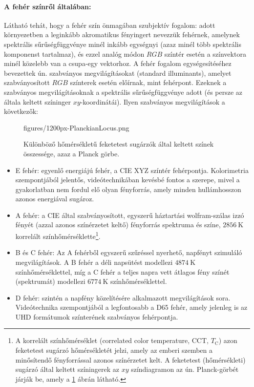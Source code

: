 \paragraph{A fehér színről általában:\\}
Látható tehát, hogy a fehér szín önmagában szubjektív fogalom: adott környezetben a leginkább akromatikus fényingert nevezzük fehérnek, amelynek spektrális sűrűségfüggvénye minél inkább egységnyi (azaz minél több spektrális komponenst tartalmaz), és ezzel analóg módon $RGB$ színtér esetén a színvektora minél közelebb van a csupa-egy vektorhoz.
A fehér fogalom egységesítéséhez bevezettek ún. szabványos megvilágításokat (standard illuminants), amelyet szabványosított $RGB$ színterek esetén előírnak, mint fehérpont.
Ezeknek a szabványos megvilágításoknak a spektrális sűrűségfüggvénye adott (és persze az általa keltett színinger $xy$-koordinátái).
Ilyen szabványos megvilágítások a következők:
\begin{figure}[]
	\centering
	\begin{minipage}[c]{0.6\textwidth}
	\begin{overpic}[width = 0.9\columnwidth ]{figures/1200px-PlanckianLocus.png}
	\end{overpic} \end{minipage}\hfill
	\begin{minipage}[c]{0.4\textwidth}
	\caption{Különböző hőmérsékletű feketetest sugárzók által keltett színek összessége, azaz a Planck görbe.}
	\label{Fig:planck}  \end{minipage}
\end{figure}
\begin{itemize}
\item E fehér: egyenlő energiájú fehér, a CIE XYZ színtér fehérpontja. Kolorimetria szempontjából jelentős, videótechnikában kevésbé fontos a szerepe, mivel a gyakorlatban nem fordul elő olyan fényforrás, amely minden hullámhosszon azonos energiával sugároz.
\item A fehér: a CIE által szabványosított, egyszerű háztartási wolfram-szálas izzó fényét (azzal azonos színérzetet keltő) fényforrás spektruma és színe, $2856~\mathrm{K}$ korrelált színhőmérséklette\footnote{A korrelált színhőmérséklet (correlated color temperature, CCT, $T_{\mathrm{C}}$) azon feketetest sugárzó hőmérsékletét jelzi, amely az emberi szemben a minősítendő fényforrással azonos színérzetet kelt.
A feketetest (hőmérsékleti) sugárzó által keltett színingerek az $xy$ színdiagramon az ún. Planck-görbét járják be, amely a \ref{Fig:planck} ábrán látható.}.
\item B és C fehér: Az A fehérből egyszerű szűréssel nyerhető, napfényt szimuláló megvilágítások.
A B fehér a déli napsütést modellezi $4874~\mathrm{K}$ színhőmérséklettel, míg a C fehér a teljes napra vett átlagos fény színét (spektrumát) modellezi $6774~\mathrm{K}$ színhőmérséklettel.
\item D fehér: szintén a napfény közelítésére alkalmazott megvilágítások sora.
Videótechnika szempontjából a legfontosabb a D65 fehér, amely jelenleg is az UHD formátumok színterének szabványos fehérpontja.
\end{itemize}

